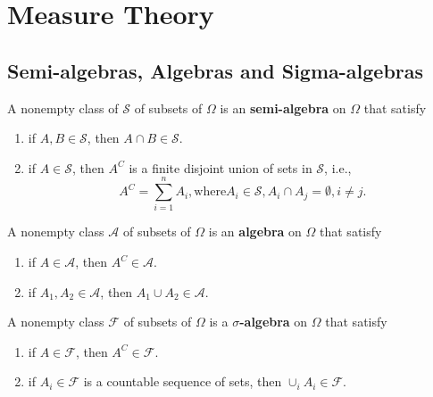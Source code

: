 \chapter{Measure Theory}

\section{Semi-algebras, Algebras and Sigma-algebras}

\begin{definition}
    A nonempty class of $\mathcal{S}$ of subsets of $\Omega$ is an \textbf{semi-algebra} on $\Omega$ that satisfy
    \begin{enumerate}
        \item if $A,B\in\mathcal{S}$, then $A\cap B\in\mathcal{S}$.
        \item if $A\in\mathcal{S}$, then $A^C$ is a finite disjoint union of sets in $\mathcal{S}$, i.e., $$A^C=\sum_{i=1}^{n}A_i, \text{where} A_i\in\mathcal{S}, A_i\cap A_j=\emptyset ,i\neq j.$$
    \end{enumerate}
\end{definition}

\begin{definition}[Algebra]
    A nonempty class $\mathcal{A}$ of subsets of $\Omega$ is an \textbf{algebra} on $\Omega$ that satisfy
    \begin{enumerate}
        \item if $A\in\mathcal{A}$, then $A^C\in\mathcal{A}$.
        \item if $A_1, A_2\in\mathcal{A}$, then $A_1\cup A_2\in\mathcal{A}$.
    \end{enumerate}
\end{definition}



\begin{definition}
    A nonempty class $\mathcal{F}$ of subsets of $\Omega$ is a \textbf{$\sigma$-algebra} on $\Omega$ that satisfy
    \begin{enumerate}
        \item if $A\in\mathcal{F}$, then $A^C\in\mathcal{F}$.
        \item if $A_i\in\mathcal{F}$ is a countable sequence of sets, then $\cup_iA_i\in\mathcal{F}$.
    \end{enumerate}
\end{definition}

